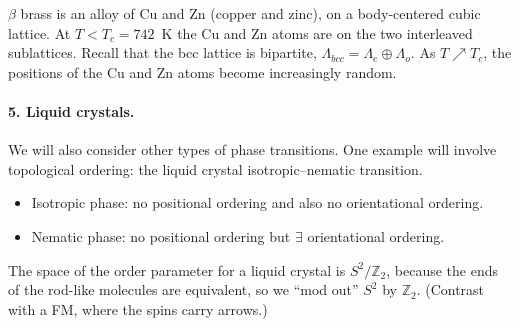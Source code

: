 $\beta$ brass is an alloy of Cu and Zn (copper and zinc), on a body-centered cubic lattice.
At $T<T_c = 742$~K the Cu and Zn atoms are on the two interleaved sublattices. Recall
that the bcc lattice is bipartite, $\Lambda_{bcc} = \Lambda_e\oplus\Lambda_o$. As
$T\nearrow T_c$, the positions of the Cu and Zn atoms become increasingly random.

\begin{diagram}
\end{diagram}

\paragraph{5. Liquid crystals.}

We will also consider other types of phase transitions. One example will involve
topological ordering: the liquid crystal isotropic--nematic transition.
\begin{itemize}
  \item Isotropic phase: no positional ordering and also no orientational ordering.
  \item Nematic phase: no positional ordering but $\exists$ orientational ordering.
\end{itemize}
The space of the order parameter for a liquid crystal is $S^2/\mathbb{Z}_2$, because the
ends of the rod-like molecules are equivalent, so we ``mod out'' $S^2$ by $\mathbb{Z}_2$.
(Contrast with a FM, where the spins carry arrows.)

